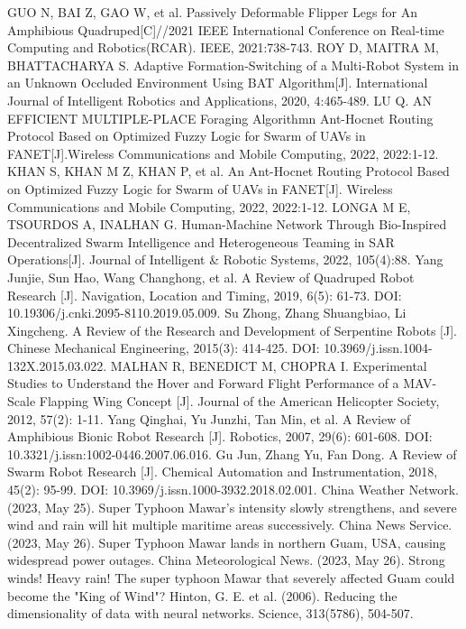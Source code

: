 \documentclass[conference]{IEEEtran}
\begin{document}
\begin{thebibliography}{00}
 GUO N, BAI Z, GAO W, et al. Passively Deformable Flipper Legs for An Amphibious Quadruped[C]//2021 IEEE International Conference on Real-time Computing and Robotics(RCAR). IEEE, 2021:738-743.
 ROY D, MAITRA M, BHATTACHARYA S. Adaptive Formation-Switching of a Multi-Robot System in an Unknown Occluded Environment Using BAT Algorithm[J]. International Journal of Intelligent Robotics and Applications, 2020, 4:465-489.
 LU Q. AN EFFICIENT MULTIPLE-PLACE Foraging Algorithmn Ant-Hocnet Routing Protocol Based on Optimized Fuzzy Logic for Swarm of UAVs in FANET[J].Wireless Communications and Mobile Computing, 2022, 2022:1-12.
 KHAN S, KHAN M Z, KHAN P, et al. An Ant-Hocnet Routing Protocol Based on Optimized Fuzzy Logic for Swarm of UAVs in FANET[J]. Wireless Communications and Mobile Computing, 2022, 2022:1-12.
 LONGA M E, TSOURDOS A, INALHAN G. Human-Machine Network Through Bio-Inspired Decentralized Swarm Intelligence and Heterogeneous Teaming in SAR Operations[J]. Journal of Intelligent \& Robotic Systems, 2022, 105(4):88.
 Yang Junjie, Sun Hao, Wang Changhong, et al. A Review of Quadruped Robot Research [J]. Navigation, Location and Timing, 2019, 6(5): 61-73. DOI: 10.19306/j.cnki.2095-8110.2019.05.009.
 Su Zhong, Zhang Shuangbiao, Li Xingcheng. A Review of the Research and Development of Serpentine Robots [J]. Chinese Mechanical Engineering, 2015(3): 414-425. DOI: 10.3969/j.issn.1004-132X.2015.03.022. 
 MALHAN R, BENEDICT M, CHOPRA I. Experimental Studies to Understand the Hover and Forward Flight Performance of a MAV-Scale Flapping Wing Concept [J]. Journal of the American Helicopter Society, 2012, 57(2): 1-11. 
 Yang Qinghai, Yu Junzhi, Tan Min, et al. A Review of Amphibious Bionic Robot Research [J]. Robotics, 2007, 29(6): 601-608. DOI: 10.3321/j.issn:1002-0446.2007.06.016.
 Gu Jun, Zhang Yu, Fan Dong. A Review of Swarm Robot Research [J]. Chemical Automation and Instrumentation, 2018, 45(2): 95-99. DOI: 10.3969/j.issn.1000-3932.2018.02.001.
 China Weather Network. (2023, May 25). Super Typhoon Mawar's intensity slowly strengthens, and severe wind and rain will hit multiple maritime areas successively.
 China News Service. (2023, May 26). Super Typhoon Mawar lands in northern Guam, USA, causing widespread power outages.
 China Meteorological News. (2023, May 26). Strong winds! Heavy rain! The super typhoon Mawar that severely affected Guam could become the "King of Wind"? 
 Hinton, G. E. et al. (2006). Reducing the dimensionality of data with neural networks. Science, 313(5786), 504-507.

\end{thebibliography}
\end{document}
